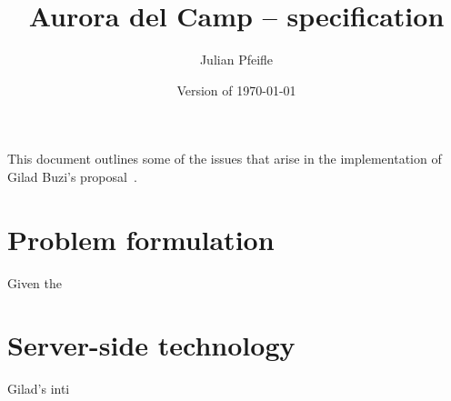 \documentclass[11pt]{amsart}
\begin{document}
\title{Aurora del Camp -- specification}
\author{Julian Pfeifle}
\date{Version of \today}
\maketitle

This document outlines some of the issues that arise in the
implementation of Gilad Buzi's proposal~\cite{buzi11}.


\section{Problem formulation}

Given the 

\section{Server-side technology}

Gilad's inti



\end{document}
